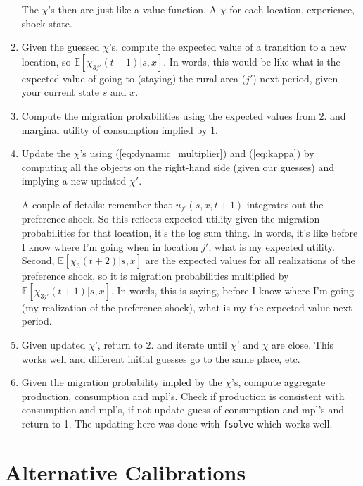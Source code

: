 \documentclass[12pt,pdftex]{article}
\begin{document}
\begin{onehalfspacing}
\begin{enumerate}
    The $\chi$'s then are just like a value function. A $\chi$ for each location, experience, shock state.

\item Given the guessed $\chi$'s, compute the expected value of a transition to a new location, so $\mathbb{E}\left[\chi_{3j'}(t+1)| s,x \right]$. In words, this would be like what is the expected value of going to (staying) the rural area ($j'$) next period, given your current state $s$ and $x$.

\item Compute the migration probabilities using the expected values from $2.$ and marginal utility of consumption implied by $1.$

\item Update the $\chi$'s using (\ref{eq:dynamic_multiplier}) and (\ref{eq:kappa}) by computing all the objects on the right-hand side (given our guesses) and implying a new updated $\chi'$.

A couple of details: remember that $u_{j'}(s,x,t+1)$ integrates out the preference shock. So this reflects expected utility given the migration probabilities for that location, it's the log sum thing. In words, it's like before I know where I'm going when in location $j'$, what is my expected utility. Second, $\mathbb{E}\left[\chi_{3}(t+2) | s,x \right]$ are the expected values for all realizations of the preference shock, so it is migration probabilities multiplied by $\mathbb{E}\left[\chi_{3j'}(t+1)| s,x \right]$. In words, this is saying, before I know where I'm going (my realization of the preference shock), what is my the expected value next period.

\item Given updated $\chi$', return to 2. and iterate until $\chi'$ and $\chi$ are close. This works well and different initial guesses go to the same place, etc.

\item Given the migration probability impled by the $\chi$'s, compute aggregate production, consumption and mpl's. Check if production is consistent with consumption and mpl's, if not update guess of consumption and mpl's and return to 1. The updating here was done with \texttt{fsolve} which works well.
\end{enumerate}






\section{Alternative Calibrations}


\end{onehalfspacing}
\end{document}

